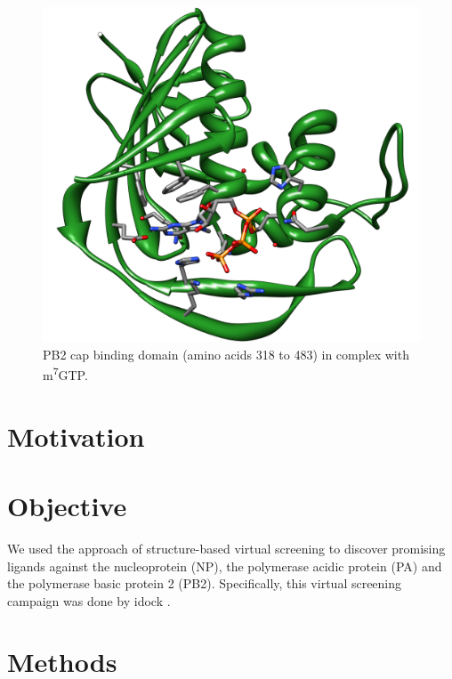 \begin{figure}
\centering
\includegraphics[width=\linewidth]{../influenza/2VQZ.png}
\caption{PB2 cap binding domain (amino acids 318 to 483) in complex with m\textsuperscript{7}GTP.}
\label{influenza:2VQZ}
\end{figure}

\section{Motivation}



\section{Objective}

We used the approach of structure-based virtual screening to discover promising ligands against the nucleoprotein (NP), the polymerase acidic protein (PA) and the polymerase basic protein 2 (PB2). Specifically, this virtual screening campaign was done by idock \citep{1153}.

\section{Methods}

